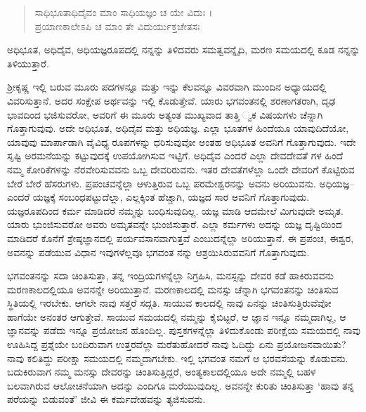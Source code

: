 \begin{verse}
ಸಾಧಿಭೂತಾಧಿದೈವಂ ಮಾಂ ಸಾಧಿಯಜ್ಞಂ ಚ ಯೇ ವಿದುಃ ।\\ಪ್ರಯಾಣಕಾಲೇಽಪಿ ಚ ಮಾಂ ತೇ ವಿದುರ್ಯುಕ್ತಚೇತಸಃ 
\end{verse}

{\small ಅಧಿಭೂತ, ಅಧಿದೈವ, ಅಧಿಯಜ್ಞರೂಪದಲ್ಲಿ ನನ್ನನ್ನು ತಿಳಿದವರು ಸಮತ್ವವನ್ನೈದಿ, ಮರಣ ಸಮಯದಲ್ಲಿ ಕೂಡ ನನ್ನನ್ನು ತಿಳಿಯುತ್ತಾರೆ.}

ಶ್ರೀಕೃಷ್ಣ ಇಲ್ಲಿ ಬರುವ ಮೂರು ಪದಗಳನ್ನೂ ಮತ್ತು ಇನ್ನು ಕೆಲವನ್ನೂ ವಿವರವಾಗಿ ಮುಂದಿನ ಅಧ್ಯಾಯದಲ್ಲಿ ವಿವರಿಸುತ್ತಾನೆ. ಅದರ ಸಂಕ್ಷೇಪ ಅರ್ಥವನ್ನು ಇಲ್ಲಿ ಕೊಡುತ್ತೇವೆ. ಯಾರು ಭಗವಂತನಲ್ಲಿ ಶರಣಾಗತರಾಗಿ, ದೃಢ ಭಾವದಿಂದ ಭಜಿಸುವರೋ, ಅವರಿಗೆ ಈ ಮೂರು ಅತ್ಯಂತ ಮುಖ್ಯವಾದ ತಾತ್ತಿ ್ವಕ ವಿಷಯಗಳು ಚೆನ್ನಾಗಿ ಗೊತ್ತಾಗುವುವು. ಅದೇ ಅಧಿಭೂತ, ಅಧಿದೈವ ಮತ್ತು ಅಧಿಯಜ್ಞ. ಎಲ್ಲಾ ಭೂತಗಳ ಹಿಂದೆಯೂ ಯಾವುದಿದೆಯೋ, ಯಾವುವು ಮಾರ್ಪಾಡಾಗಿ ವೈವಿಧ್ಯ ರೂಪಗಳನ್ನು ಧರಿಸುವುವೋ ಅಂತಹ ಅಧಿಭೂತ ಅವನಿಗೆ ಗೊತ್ತಾಗುವುದು. ಇದೇ ಸೃಷ್ಟಿ ಅರಮನೆಯನ್ನು ಕಟ್ಟುವುದಕ್ಕೆ ಉಪಯೋಗಿಸುವ ಇಟ್ಟಿಗೆ. ಅಧಿದೈವ ಎಂದರೆ ಎಲ್ಲಾ ದೇವದೇವತೆ ಗಳ ಹಿಂದೆ ನಮ್ಮ ಕೋರಿಕೆಗಳನ್ನು ನೆರವೇರಿಸುವವನು ಒಬ್ಬ ದೇವರಿರುವನು. ಇತರ ದೇವತೆಗಳೆಲ್ಲಾ ಒಂದೇ ದೇವರಿಗೆ ಕೊಟ್ಟಿರುವ ಬೇರೆ ಬೇರೆ ಹೆಸರುಗಳು. ಪ್ರಪಂಚವನ್ನೆಲ್ಲಾ ಆಳುತ್ತಿರುವ ಒಬ್ಬ ಪರಮೇಶ್ವರನನ್ನು ಅವನು ಅರಿಯುವನು. ಅಧಿಯಜ್ಞ–ಎಂದರೆ ಯಜ್ಞಕ್ಕೆ ಸಂಬಂಧಪಟ್ಟುದೆಲ್ಲಾ, ಎಲ್ಲಕ್ಕಿಂತ ಹೆಚ್ಚಾಗಿ, ಯಜ್ಞದ ಸಾರ ಅವನಿಗೆ ಗೊತ್ತಾಗುವುದು. ಯಜ್ಞರೂಪದಿಂದ ಕರ್ಮ ಮಾಡಿದರೆ ನಮ್ಮನ್ನು ಬಂಧಿಸುವುದಿಲ್ಲ. ಯಜ್ಞ ಮಾಡಿ ಆದಮೇಲೆ ಮಿಗುವುದೇ ಅಮೃತ. ಯಾರು ಭುಂಜಿಸುವರೋ ಅವರು ಅಮೃತವನ್ನೇ ಭುಂಜಿಸುತ್ತಾರೆ. ಎಲ್ಲಾ ಕರ್ಮಗಳು ಅದನ್ನು ಯಜ್ಞ ದೃಷ್ಟಿಯಿಂದ ಮಾಡಿದರೆ ಕೊನೆಗೆ ಶ್ರೇಷ್ಠಜ್ಞಾನದಲ್ಲಿ ಪರ್ಯವಸಾನವಾಗುತ್ತವೆ ಎಂಬುದನ್ನೆಲ್ಲಾ ಅರಿಯುತ್ತಾನೆ. ಈ ಪ್ರಪಂಚ, ಈಶ್ವರ, ಅವನನ್ನು ಪಡೆಯುವ ವಿಧಾನ ಇವುಗಳೆಲ್ಲವೂ ಭಗವಂತ ನನ್ನು ಆಶ್ರಯಿಸಿರುವವನಿಗೆ ಗೊತ್ತಾಗುವುದು.

ಭಗವಂತನನ್ನು ಸದಾ ಚಿಂತಿಸುತ್ತಾ, ತನ್ನ ಇಂದ್ರಿಯಗಳನ್ನೆಲ್ಲಾ ನಿಗ್ರಹಿಸಿ, ಮನಸ್ಸನ್ನು ದೇವರ ಕಡೆ ಹಾಕಿರುವವನು ಮರಣಕಾಲದಲ್ಲಿಯೂ ಅವನನ್ನೇ ಅರಿಯುತ್ತಾನೆ. ಮರಣಕಾಲದಲ್ಲಿ ಮನಸ್ಸು ಚೆನ್ನಾಗಿ ಭಗವಂತನನ್ನು ಚಿಂತಿಸುವ ಸ್ಥಿತಿಯಲ್ಲಿ ಇರಬೇಕು. ಆಗಲೇ ನಾವು ಸತ್ತರೆ ಸದ್ಗತಿ. ಸಾಯುವ ಕಾಲದಲ್ಲಿ ನಾವು ಏನನ್ನು ಚಿಂತಿಸುತ್ತಿರುವೆವೋ ಹಾಗೆಯೇ ಅನಂತರ ಆಗುತ್ತೇವೆ. ಸಾಯುವ ಸಮಯದಲ್ಲಿ ನಮ್ಮನ್ನು ಕೈಬಿಟ್ಟರೆ, ಆ ಜ್ಞಾನ ಇನ್ನೂ ನಮ್ಮದಾಗಿಲ್ಲ, ಆ ಜ್ಞಾನವನ್ನು ಪಡೆದು ಇನ್ನೂ ಪ್ರಯೋಜನ ಹೊಂದಿಲ್ಲ. ಪುಸ್ತಕಗಳನ್ನೆಲ್ಲಾ ತಿಳಿದುಕೊಂಡು ಪರೀಕ್ಷೆಯ ಸಮಯದಲ್ಲಿ ನಾವು ಊಹಿಸಿದ್ದ ಪ್ರಶ್ನೆಯೇ ಬಂದಿರುವಾಗ ಉತ್ತರವೆಲ್ಲಾ ಮರೆತುಹೋದರೆ ನಾವು ಓದಿದ್ದು ಏನು ಪ್ರಯೋಜನವಾಯಿತು? ನಾವು ಕಲಿತಿದ್ದು ಪರೀಕ್ಷಾ ಸಮಯದಲ್ಲಿ ನಮ್ಮದಾಗಬೇಕು. ಇಲ್ಲಿ ಭಗವಂತ ನಮಗೆ ಆ ಭರವಸೆಯನ್ನು ಕೊಡುವನು. ಬದುಕಿರುವಾಗ ನಮ್ಮ ಮನಸ್ಸು ದೇವರನ್ನು ಚಿಂತಿಸುತ್ತಿದ್ದರೆ, ಅಂತ್ಯಕಾಲದಲ್ಲಿಯೂ ಅದೇ ನಮ್ಮಲ್ಲಿ ಬಹಳ ಬಲವಾಗಿರುವ ಆಲೋಚನೆಯಾಗಿ ಅದನ್ನು ಎಂದಿಗೂ ಮರೆಯುವುದಿಲ್ಲ. ಅವನನ್ನೇ ಕುರಿತು ಚಿಂತಿಸುತ್ತಾ ‘ಹಾವು ತನ್ನ ಪರೆಯನ್ನು ಬಿಡುವಂತೆ’ ಜೀವಿ ಈ ಕರ್ಮದೇಹವನ್ನು ತ್ಯಜಿಸುವನು.


